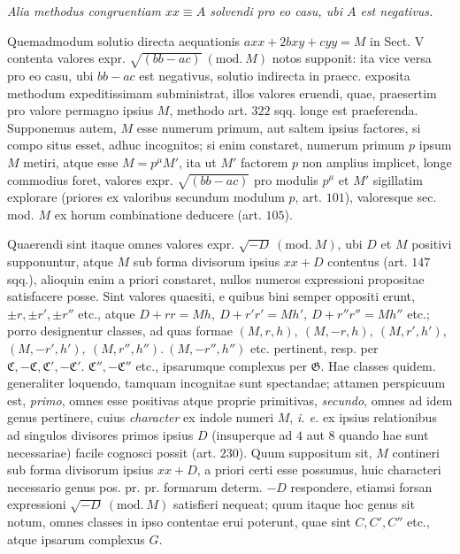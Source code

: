 \begin{center}\textit{Alia methodus congruentiam \(xx\equiv A\) solvendi pro eo casu, ubi \(A\) est negativus.}\end{center}


Quemadmodum solutio directa aequationis \(axx+2bxy+cyy=M\) in Sect. V contenta valores expr. \(\surd{(bb-ac)}\ (\mathrm{mod.}\ M)\) notos supponit: ita vice versa pro eo casu, ubi \(bb-ac\) est negativus, solutio indirecta in praecc. exposita methodum expeditissimam subministrat, illos valores eruendi, quae, praesertim pro valore permagno ipsius \(M\), methodo art. \(322\) sqq. longe est praeferenda. Supponemus autem, \(M\) esse numerum primum, aut saltem ipsius factores, si compo%
situs esset, adhuc incognitos; si enim constaret, numerum primum \(p\) ipsum \(M\) metiri, atque esse \(M=p^\mu M'\), ita ut \(M'\) factorem \(p\) non amplius implicet, longe commodius foret, valores expr. \(\surd{(bb-ac)}\) pro modulis \(p^\mu\) et \(M'\) sigillatim explorare (priores ex valoribus secundum modulum \(p\), art. \(101\)), valoresque sec. mod. \(M\) ex horum combinatione deducere (art. \(105\)).

Quaerendi sint itaque omnes valores expr. \(\surd{-D}\ (\mathrm{mod.}\ M)\), ubi \(D\) et \(M\) positivi supponuntur, atque \(M\) sub forma divisorum ipsius \(xx+D\) contentus (art. \(147\) sqq.), alioquin enim a priori constaret, nullos numeros expressioni propositae satisfacere posse. Sint valores quaesiti, e quibus bini semper oppositi erunt, \(\pm r,\allowbreak \pm r',\allowbreak \pm r''\) etc., atque \(D+rr=Mh,\allowbreak \ D+r'r'=Mh',\allowbreak \ D+r''r''=Mh''\) etc.; porro designentur classes, ad quas formae \((M,\allowbreak r,\allowbreak h),\allowbreak \ (M,\allowbreak -r,\allowbreak h),\allowbreak \ (M,\allowbreak r',\allowbreak h')\), \((M,\allowbreak -r',\allowbreak h'),\allowbreak \ (M,\allowbreak r'',\allowbreak h'').\ (M,\allowbreak -r'',\allowbreak h'')\) etc. pertinent, resp. per \(\mathfrak C,\allowbreak -\mathfrak C,\allowbreak \mathfrak C',\allowbreak -\mathfrak C'\). \(\mathfrak C'',\allowbreak -\mathfrak C''\) etc., ipsarumque complexus per \(\mathfrak G\). Hae classes quidem. generaliter loquendo, tamquam incognitae sunt spectandae; attamen perspicuum est, \textit{primo}, omnes esse positivas atque proprie primitivas, \textit{secundo}, omnes ad idem genus pertinere, cuius \textit{character} ex indole numeri \(M\), \textit{i. e.} ex ipsius relationibus ad singulos divisores primos ipsius \(D\) (insuperque ad \(4\) aut \(8\) quando hae sunt necessariae) facile cognosci possit (art. \(230\)). Quum suppositum sit, \(M\) contineri sub forma divisorum ipsius \(xx+D\), a priori certi esse possumus, huic characteri necessario genus pos. pr. pr. formarum determ. \(-D\) respondere, etiamsi forsan expressioni \(\surd{-D}\ (\mathrm{mod.}\ M)\) satisfieri nequeat; quum itaque hoc genus sit notum, omnes classes in ipso contentae erui poterunt, quae sint \(C,\allowbreak C',\allowbreak C''\) etc., atque ipsarum complexus \(G\).

